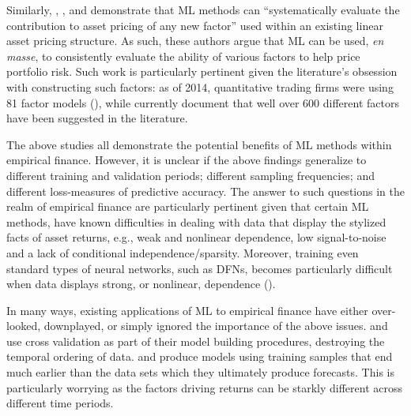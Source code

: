 \documentclass{article}
\begin{document}
Similarly, \cite{kozak_shrinking_2017}, \cite{freyberger_dissecting_2017}, \cite{feng_taming_2019} and \cite{rapach_forecasting_2013} demonstrate that ML methods can ``systematically evaluate the contribution to asset pricing of any new factor'' used within an existing linear asset pricing structure. %
As such, these authors argue that ML can be used, \textit{en masse}, to consistently evaluate the ability of various factors to help price portfolio risk. Such work is particularly pertinent given the literature's obsession with constructing such factors: as of 2014, quantitative trading firms were using 81 factor models (\cite{hsu_finding_2014}), while \cite{harvey_census_2019} currently document that well over 600 different factors have been suggested in the literature. 

The above studies all demonstrate the potential benefits of ML methods within empirical finance. However, it is unclear if the above findings generalize to different training and validation periods; different sampling frequencies; and different loss-measures of predictive accuracy. The answer to such questions in the realm of empirical finance are particularly pertinent given that certain ML methods, have known difficulties in dealing with data that display the stylized facts of asset returns, e.g., weak and nonlinear dependence, low signal-to-noise and a lack of conditional independence/sparsity. Moreover, training even standard types of neural networks, such as DFNs, becomes particularly difficult when data displays strong, or nonlinear, dependence (\cite{bengio_learning_1994}). 

In many ways, existing applications of ML to empirical finance have either over-looked, downplayed, or simply ignored the importance of the above  issues. \cite{messmer2017deep} and \cite{feng_deep_2018} use cross validation as part of their model building procedures, destroying the temporal ordering of data. \cite{gu_empirical_2018} and \cite{messmer2017deep} produce models using training samples that end much earlier than the data sets which they ultimately produce forecasts. %
This is particularly worrying as the factors driving returns can be starkly different across different time periods. %
\end{document}
